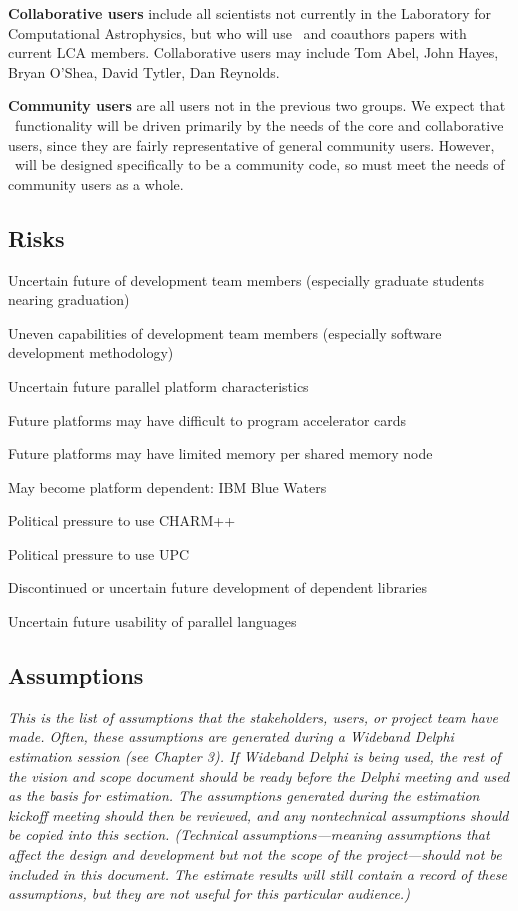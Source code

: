 \documentclass{article}
\begin{document}
    \textbf{Collaborative users} include all scientists not currently
    in the Laboratory for Computational Astrophysics, but who will use
    \cello\ and coauthors papers with current LCA members.
    Collaborative users may include Tom Abel, John Hayes, Bryan
    O'Shea, David Tytler, Dan Reynolds.

    \textbf{Community users} are all users not in the previous two
    groups.  We expect that \cello\ functionality will be driven
    primarily by the needs of the core and collaborative users, since
    they are fairly representative of general community users.
    However, \cello\ will be designed specifically to be a community
    code, so must meet the needs of community users as a whole.
    
\subsection{Risks}

Uncertain future of development team members (especially graduate students nearing graduation)

Uneven capabilities of development team members (especially software development methodology)

Uncertain future parallel platform characteristics

Future platforms may have difficult to program accelerator cards

Future platforms may have limited memory per shared memory node

May become platform dependent: IBM Blue Waters

Political pressure to use CHARM++

Political pressure to use UPC

Discontinued or uncertain future development of dependent libraries


Uncertain future usability of parallel languages

   


\subsection{Assumptions}

    \textit{This is the list of assumptions that the stakeholders, users, or
    project team have made. Often, these assumptions are generated
    during a Wideband Delphi estimation session (see Chapter 3). If
    Wideband Delphi is being used, the rest of the vision and scope
    document should be ready before the Delphi meeting and used as the
    basis for estimation. The assumptions generated during the
    estimation kickoff meeting should then be reviewed, and any
    nontechnical assumptions should be copied into this
    section. (Technical assumptions---meaning assumptions that affect
    the design and development but not the scope of the
    project---should not be included in this document. The estimate
    results will still contain a record of these assumptions, but they
    are not useful for this particular audience.)}
\end{document}
